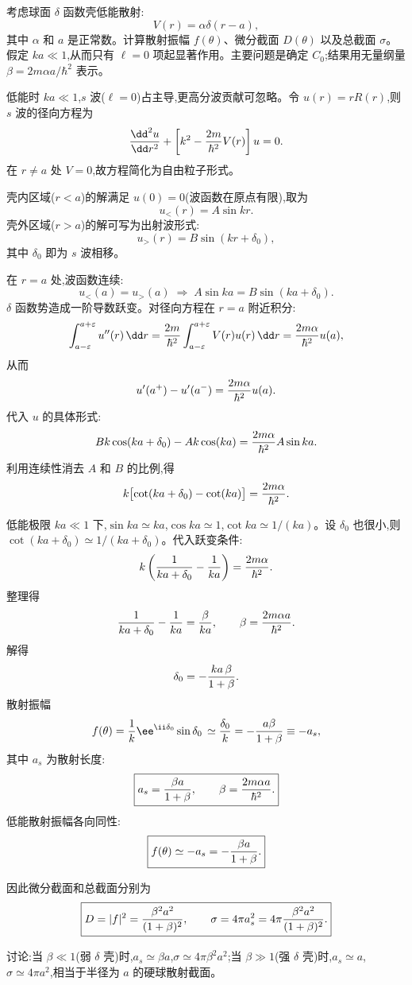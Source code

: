 \begin{question}
考虑球面 $\delta$ 函数壳低能散射:
\[
V(r)=\alpha\delta(r-a),
\]
其中 $\alpha$ 和 $a$ 是正常数。计算散射振幅 $f(\theta)$、微分截面 $D(\theta)$ 以及总截面 $\sigma$。假定 $ka\ll 1$,从而只有 $\ell=0$ 项起显著作用。主要问题是确定 $C_0$;结果用无量纲量 $\beta=2m\alpha a/\hbar^2$ 表示。
\end{question}
\begin{solution}
低能时 $ka\ll1$,$s$ 波($\ell=0$)占主导,更高分波贡献可忽略。令 $u(r)=rR(r)$,则 $s$ 波的径向方程为
\[
{\dd^2u\over\dd r^2}+\left[k^2-{2m\over\hbar^2}V(r)\right]u=0.
\]
在 $r\neq a$ 处 $V=0$,故方程简化为自由粒子形式。

壳内区域($r<a$)的解满足 $u(0)=0$(波函数在原点有限),取为
\[
u_{<}(r)=A\sin kr.
\]
壳外区域($r>a$)的解可写为出射波形式:
\[
u_{>}(r)=B\sin(kr+\delta_0),
\]
其中 $\delta_0$ 即为 $s$ 波相移。

在 $r=a$ 处,波函数连续:
\[
u_{<}(a)=u_{>}(a)\;\Longrightarrow\;A\sin ka=B\sin(ka+\delta_0).
\]
$\delta$ 函数势造成一阶导数跃变。对径向方程在 $r=a$ 附近积分:
\[
\int_{a-\varepsilon}^{a+\varepsilon}u''(r)\,\dd r
={2m\over\hbar^2}\int_{a-\varepsilon}^{a+\varepsilon}V(r)u(r)\,\dd r
={2m\alpha\over\hbar^2}u(a),
\]
从而
\[
u'(a^+)-u'(a^-)={2m\alpha\over\hbar^2}u(a).
\]
代入 $u$ 的具体形式:
\[
Bk\cos(ka+\delta_0)-Ak\cos(ka)={2m\alpha\over\hbar^2}A\sin ka.
\]
利用连续性消去 $A$ 和 $B$ 的比例,得
\[
k\bigl[\cot(ka+\delta_0)-\cot(ka)\bigr]={2m\alpha\over\hbar^2}.
\]

低能极限 $ka\ll1$ 下,$\sin ka\simeq ka$,$\cos ka\simeq1$,$\cot ka\simeq 1/(ka)$。设 $\delta_0$ 也很小,则 $\cot(ka+\delta_0)\simeq 1/(ka+\delta_0)$。代入跃变条件:
\[
k\left({1\over ka+\delta_0}-{1\over ka}\right)={2m\alpha\over\hbar^2}.
\]
整理得
\[
{1\over ka+\delta_0}-{1\over ka}={\beta\over ka},\qquad\beta={2m\alpha a\over\hbar^2}.
\]
解得
\[
\delta_0=-{ka\,\beta\over1+\beta}.
\]
散射振幅
\[
f(\theta)={1\over k}\ee^{\ii\delta_0}\sin\delta_0\,
\simeq{\delta_0\over k}
=-{a\beta\over1+\beta}\equiv -a_s,
\]
其中 $a_s$ 为散射长度:
\[
\boxed{a_s={\beta a\over1+\beta},\qquad\beta={2m\alpha a\over\hbar^2}.}
\]
低能散射振幅各向同性:
\[
\boxed{f(\theta)\simeq -a_s=-{\beta a\over1+\beta}.}
\]

因此微分截面和总截面分别为
\[
\boxed{D=|f|^2={\beta^2a^2\over(1+\beta)^2},
\qquad
\sigma=4\pi a_s^2=4\pi{\beta^2a^2\over(1+\beta)^2}.}
\]

讨论:当 $\beta\ll1$(弱 $\delta$ 壳)时,$a_s\simeq\beta a$,$\sigma\simeq 4\pi\beta^2a^2$;当 $\beta\gg1$(强 $\delta$ 壳)时,$a_s\simeq a$,$\sigma\simeq 4\pi a^2$,相当于半径为 $a$ 的硬球散射截面。
\end{solution}

